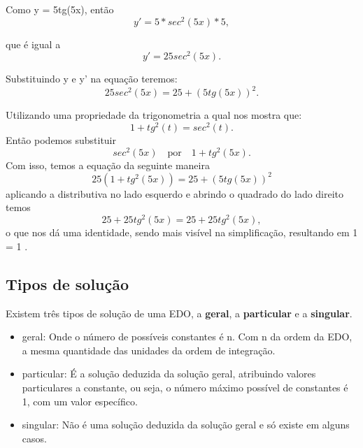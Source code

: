 \begin{center}

\begin{flushleft}
Como y = 5tg(5x), então \begin{equation}  y' = 5 * sec^2(5x) * 5,  \end{equation} 
\end{flushleft}

\begin{flushleft}
que é igual a \begin{equation} y' = 25sec^2(5x).  \end{equation}
\end{flushleft}

\begin{flushleft}
Substituindo y e y' na equação teremos: \begin{equation} 25sec^2(5x) = 25 + (5tg(5x))^2. \end{equation}

Utilizando uma propriedade da trigonometria a qual nos mostra que: \begin{equation} 1 + tg^2(t) = sec^2(t). \end{equation}
Então podemos substituir \begin{equation} sec^2(5x) \quad  \textrm{por} \quad 1 + tg^2(5x). \end{equation}
Com isso, temos a equação da seguinte maneira \begin{equation} 25(1 + tg^2(5x)) = 25 + (5tg(5x))^2 \end{equation} aplicando a distributiva no lado esquerdo e abrindo o quadrado do lado direito temos \begin{equation} 25 + 25tg^2(5x) = 25 + 25tg^2(5x), \end{equation} o que nos dá uma identidade, sendo mais visível na simplificação, resultando em 1 = 1
\cite{explicacaoEDO}.

\end{flushleft}
\end{center}

\subsection[Tipos de solução]{Tipos de solução}
Existem três tipos de solução de uma EDO, a \textbf{geral}, a \textbf{particular} e a \textbf{singular}.
\begin{itemize}
	\item{geral:} Onde o número de possíveis constantes é n. Com n da ordem da EDO, a mesma quantidade das unidades da ordem de integração. 
	\item{particular:} É a solução deduzida da solução geral, atribuindo valores particulares a constante, ou seja, o número máximo possível de constantes é 1, com um valor específico.
	\item{singular:} Não é uma solução deduzida da solução geral e só existe em alguns casos.
\end{itemize}

